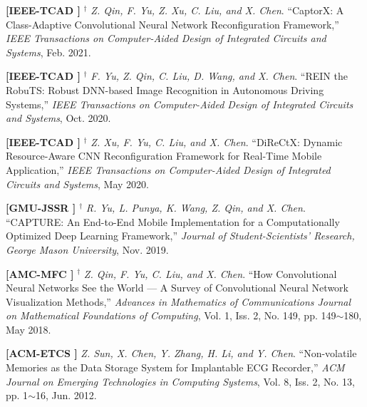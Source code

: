 	\textbf{[IEEE-TCAD ]}
	$^\dagger$
	\textsl{Z. Qin, F. Yu, Z. Xu, C. Liu, and X. Chen}.
		``CaptorX\@: A Class-Adaptive Convolutional Neural Network Reconfiguration Framework,''
		\textsl{IEEE Transactions on Computer-Aided Design of Integrated Circuits and Systems}, Feb. 2021.
			\vspace{-3mm}

	\textbf{[IEEE-TCAD ]}
	$^\dagger$
	\textsl{F. Yu, Z. Qin, C. Liu, D. Wang, and X. Chen}.
		``REIN the RobuTS\@: Robust DNN-based Image Recognition in Autonomous Driving Systems,''
		\textsl{IEEE Transactions on Computer-Aided Design of Integrated Circuits and Systems}, Oct. 2020.
			\vspace{-3mm}

	\textbf{[IEEE-TCAD ]}
	$^\dagger$
	\textsl{Z. Xu, F. Yu, C. Liu, and X. Chen}.
		``DiReCtX\@: Dynamic Resource-Aware CNN Reconfiguration Framework for Real-Time Mobile Application,''
		\textsl{IEEE Transactions on Computer-Aided Design of Integrated Circuits and Systems}, May 2020.
			\vspace{-3mm}

	\textbf{[GMU-JSSR ]}
	$^\dagger$
	\textsl{R. Yu, L. Punya, K. Wang, Z. Qin, and X. Chen}.
		``CAPTURE\@: An End-to-End Mobile Implementation for a Computationally Optimized Deep Learning Framework,''
		\textsl{Journal of Student-Scientists' Research, George Mason University}, Nov. 2019.
			\vspace{-3mm}

	\textbf{[AMC-MFC ]}
	$^\dagger$
	\textsl{Z. Qin, F. Yu, C. Liu, and X. Chen}.
		``How Convolutional Neural Networks See the World --- A Survey of Convolutional Neural Network Visualization Methods,''
		\textsl{Advances in Mathematics of Communications Journal on Mathematical Foundations of Computing}, Vol. 1, Iss. 2, No. 149, pp. 149$\sim$180, May 2018.
			\vspace{-3mm}

	\textbf{[ACM-ETCS ]}\hspace{2mm}
	\textsl{Z. Sun, X. Chen, Y. Zhang, H. Li, and Y. Chen}.
		``Non-volatile Memories as the Data Storage System for Implantable ECG Recorder,''
		\textsl{ACM Journal on Emerging Technologies in Computing Systems}, Vol. 8, Iss. 2, No. 13, pp. 1$\sim$16, Jun. 2012.
			\vspace{-3mm}

